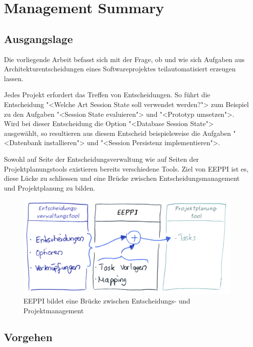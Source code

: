 \chapter*{Management Summary}
		
	\section*{Ausgangslage}
	
	Die vorliegende Arbeit befasst sich mit der Frage,
	ob und wie sich Aufgaben aus Architekturentscheidungen eines Softwareprojektes teilautomatisiert erzeugen lassen.
	
	Jedes Projekt erfordert das Treffen von Entscheidungen.
	So führt die Entscheidung "<Welche Art Session State soll verwendet werden?"> zum Beispiel zu den Aufgaben
	"<Session State evaluieren"> und "<Prototyp umsetzen">.
	Wird bei dieser Entscheidung die Option "<Database Session State"> ausgewählt,
	so resultieren aus diesem Entscheid beispielsweise die Aufgaben "<Datenbank installieren"> und
		"<Session Persistenz implementieren">.
	
	Sowohl auf Seite der Entscheidungsverwaltung wie auf Seiten der Projektplanungstools existieren bereits verschiedene Tools.
	Ziel von EEPPI ist es, diese Lücke zu schliessen und eine Brücke zwischen Entscheidungsmanagement und Projektplanung zu bilden.
	
	\begin{figure}[H]
		\includegraphics[width=\textwidth]{introduction/img/eeppiVision.png}
		\centering
		\caption{EEPPI bildet eine Brücke zwischen Entscheidungs- und Projektmanagement}
		\label{fig:eeppiBridgeBetweenDecisionsAndTasks}
	\end{figure}
	
	
	\section*{Vorgehen}
	
